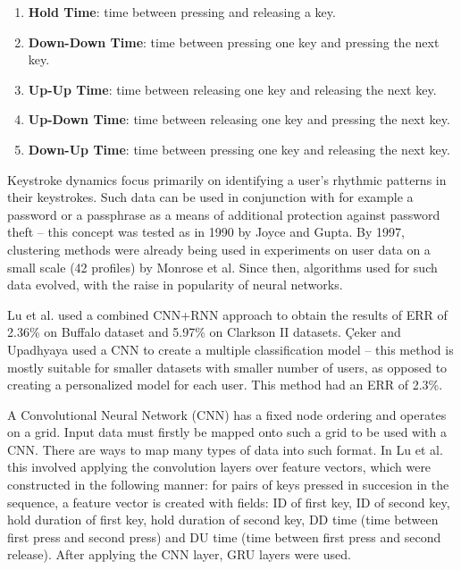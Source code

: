 \begin{enumerate}
    \item \textbf{Hold Time}: time between pressing and releasing a key.
    \item \textbf{Down-Down Time}: time between pressing one key and pressing the next key.
    \item \textbf{Up-Up Time}: time between releasing one key and releasing the next key.
    \item \textbf{Up-Down Time}: time between releasing one key and pressing the next key.
    \item \textbf{Down-Up Time}: time between pressing one key and releasing the next key.
\end{enumerate}

Keystroke dynamics focus primarily on identifying a user's rhythmic patterns in their keystrokes. Such data can be used in conjunction with for example a password or a passphrase as a means of additional protection against password theft -- this concept was tested as in 1990 by Joyce and Gupta. \cite{joyce1990keystroke} By 1997, clustering methods were already being used in experiments on user data on a small scale (42 profiles) by Monrose et al. \cite{Monr1997} Since then, algorithms used for such data evolved, with the raise in popularity of neural networks.

Lu et al. \cite{Lu2020} used a combined CNN+RNN approach to obtain the results of ERR of 2.36\% on Buffalo dataset and 5.97\% on Clarkson II datasets. Çeker and Upadhyaya \cite{ceker_cnn2017} used a CNN to create a multiple classification model -- this method is mostly suitable for smaller datasets with smaller number of users, as opposed to creating a personalized model for each user. This method had an ERR of 2.3\%. 

A Convolutional Neural Network (CNN) has a fixed node ordering and operates on a grid. Input data must firstly be mapped onto such a grid to be used with a CNN. There are ways to map many types of data into such format. In Lu et al. this involved applying the convolution layers over feature vectors, which were constructed in the following manner: for pairs of keys pressed in succesion in the sequence, a feature vector is created with fields: ID of first key, ID of second key, hold duration of first key, hold duration of second key, DD time (time between first press and second press) and DU time (time between first press and second release). After applying the CNN layer, GRU layers were used.

